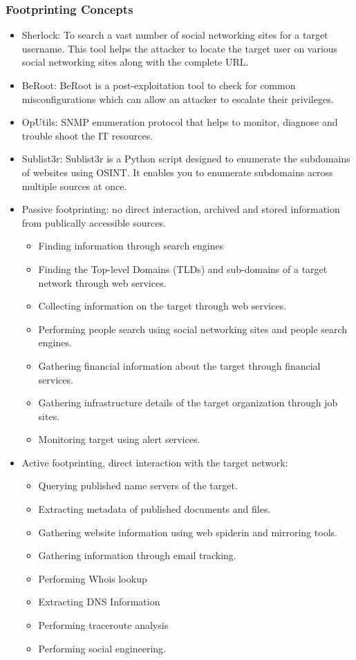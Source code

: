 \subsubsection{Footprinting Concepts}
\begin{itemize}
    \item Sherlock: To search a vast number of social networking sites for a target username. This tool helps the attacker to locate the target user on various social networking sites along with the complete URL.
    \item BeRoot: BeRoot is a post-exploitation tool to check for common misconfigurations which can allow an attacker to escalate their privileges.
    \item OpUtils: SNMP enumeration protocol that helps to monitor, diagnose and trouble shoot the IT resources.
    \item Sublist3r: Sublist3r is a Python script designed to enumerate the subdomains of websites using OSINT. It enables you to enumerate subdomains across multiple sources at once.
    \item Passive footprinting: no direct interaction, archived and stored information from publically accessible sources.
    \begin{itemize}
        \item Finding information through search engines
        \item Finding the Top-level Domains (TLDs) and sub-domains of a target network through web services.
        \item Collecting information on the target through web services.
        \item Performing people search using social networking sites and people search engines.
        \item Gathering financial information about the target through financial services.
        \item Gathering infrastructure details of the target organization through job sites.
        \item Monitoring target using alert services.
    \end{itemize}
    \item Active footprinting, direct interaction with the target network:
    \begin{itemize}
        \item Querying published name servers of the target.
        \item Extracting metadata of published documents and files.
        \item Gathering website information using web spiderin and mirroring tools.
        \item Gathering information through email tracking.
        \item Performing Whois lookup
        \item Extracting DNS Information
        \item Performing traceroute analysis
        \item Performing social engineering.
    \end{itemize}
\end{itemize}

